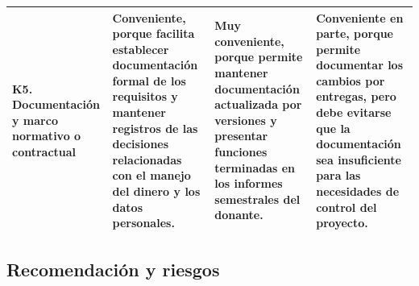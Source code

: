 \documentclass[12pt,a4paper]{article}
\begin{document}
\begin{table}[H]
\begin{tabularx}{\textwidth}{
    >{\raggedright\arraybackslash}p{2.35cm} Y Y Y
}
\textbf{K5. Documentación y marco normativo o contractual}
&
Conveniente, porque facilita establecer documentación formal de los requisitos y mantener registros de las decisiones relacionadas con el manejo del dinero y los datos personales.
&
Muy conveniente, porque permite mantener documentación actualizada por versiones y presentar funciones terminadas en los informes semestrales del donante.
&
Conveniente en parte, porque permite documentar los cambios por entregas, pero debe evitarse que la documentación sea insuficiente para las necesidades de control del proyecto.
\\
\bottomrule
\end{tabularx}
\end{table}

\FloatBarrier
\subsection{Recomendación y riesgos}
\end{document}
